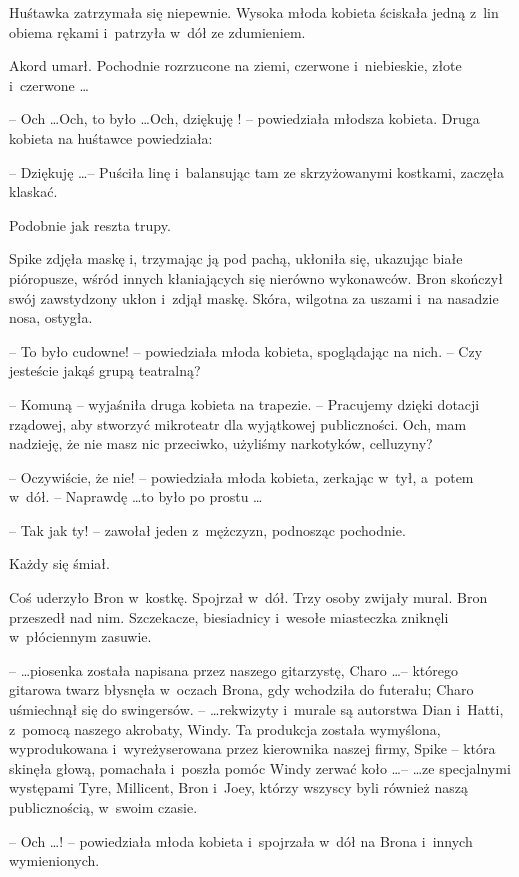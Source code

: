 \documentclass[oneside,polish,11pt,rmheadings]{mwbk}
\begin{document}
Huśtawka zatrzymała się niepewnie. Wysoka młoda kobieta ściskała jedną z~lin obiema rękami i~patrzyła w~dół ze zdumieniem. 

Akord umarł. Pochodnie rozrzucone na ziemi, czerwone i~niebieskie, złote i~czerwone \ldots  

-- Och \ldots  Och, to było \ldots  Och, dziękuję ! -- powiedziała młodsza kobieta. Druga kobieta na huśtawce powiedziała: 

-- Dziękuję  \ldots  -- Puściła linę i~balansując tam ze skrzyżowanymi kostkami, zaczęła klaskać. 

Podobnie jak reszta trupy. 

Spike zdjęła maskę i, trzymając ją pod pachą, ukłoniła się, ukazując białe pióropusze, wśród innych kłaniających się nierówno wykonawców. Bron skończył swój zawstydzony ukłon i~zdjął maskę. Skóra, wilgotna za uszami i~na nasadzie nosa, ostygła. 

-- To było cudowne!  -- powiedziała młoda kobieta, spoglądając na nich. -- Czy jesteście jakąś grupą teatralną? 

-- Komuną -- wyjaśniła druga kobieta na trapezie. -- Pracujemy dzięki dotacji rządowej, aby stworzyć mikroteatr dla wyjątkowej publiczności. Och, mam nadzieję, że nie masz nic przeciwko, użyliśmy narkotyków, celluzyny? 

-- Oczywiście, że nie! -- powiedziała młoda kobieta, zerkając w~tył, a~potem w~dół. -- Naprawdę \ldots  to było po prostu \ldots  

-- Tak jak ty! -- zawołał jeden z~mężczyzn, podnosząc pochodnie. 

Każdy się śmiał. 

Coś uderzyło Bron w~kostkę. Spojrzał w~dół. Trzy osoby zwijały mural. Bron przeszedł nad nim. Szczekacze, biesiadnicy i~wesołe miasteczka zniknęli w~płóciennym zasuwie. 

--  \ldots piosenka została napisana przez naszego gitarzystę, Charo \ldots  -- którego gitarowa twarz błysnęła w~oczach Brona, gdy wchodziła do futerału; Charo uśmiechnął się do swingersów. --  \ldots  rekwizyty i~murale są autorstwa Dian i~Hatti, z~pomocą naszego akrobaty, Windy. Ta produkcja została wymyślona, wyprodukowana i~wyreżyserowana przez kierownika naszej firmy, Spike – która skinęła głową, pomachała i~poszła pomóc Windy zerwać koło \ldots  --  \ldots  ze specjalnymi występami Tyre, Millicent, Bron i~Joey, którzy wszyscy byli również naszą publicznością, w~swoim czasie. 

-- Och  \ldots  ! -- powiedziała młoda kobieta i~spojrzała w~dół na Brona i~innych wymienionych. 
\end{document}
